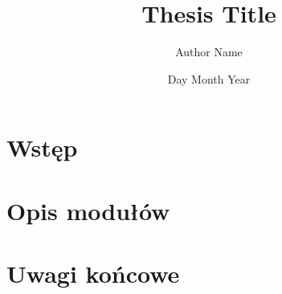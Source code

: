 \documentclass[12pt,twoside]{report}
\title{Thesis Title}
\author{Author Name}
\date{Day Month Year}
\begin{document}
	
	\tableofcontents	
	
	\chapter{Wstęp}
    

    \chapter{Opis modułów}
    

	  \chapter{Uwagi końcowe}
    
    
    
    
\end{document}
